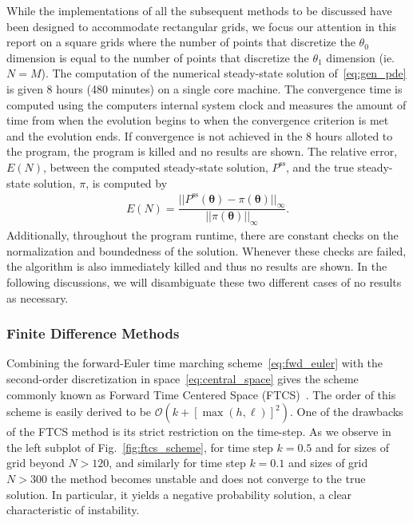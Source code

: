 \documentclass[11pt]{article}
\begin{document}
While the implementations of all the subsequent methods to be discussed have been designed to accommodate rectangular grids, we focus our attention in this report on a square grids where the number of points that discretize the $\theta_{0}$ dimension is equal to the number of points that discretize the $\theta_{1}$ dimension (ie. $N=M$). The computation of the numerical steady-state solution of~\eqref{eq:gen_pde} is given 8 hours (480 minutes) on a single core machine. The convergence time is computed using the computers internal system clock and measures the amount of time from when the evolution begins to when the convergence criterion is met and the evolution ends. If convergence is not achieved in the 8 hours alloted to the program, the program is killed and no results are shown. The relative error, $E(N)$, between the computed steady-state solution, $P^{\mathrm{ss}}$, and the true steady-state solution, $\pi$, is computed by
\begin{align}
    E(N) = \dfrac{||P^{\mathrm{ss}}(\bm{\theta})-\pi(\bm{\theta})||_{\infty}}{||\pi(\bm{\theta})||_{\infty}}.
\end{align}
Additionally, throughout the program runtime, there are constant checks on the normalization and boundedness of the solution. Whenever these checks are failed, the algorithm is also immediately killed and thus no results are shown. In the following discussions, we will disambiguate these two different cases of no results as necessary.

\subsubsection{Finite Difference Methods}

Combining the forward-Euler time marching scheme~\eqref{eq:fwd_euler} with the second-order discretization in space~\eqref{eq:central_space} gives the scheme commonly known as Forward Time Centered Space (FTCS)~\cite{fletcher2013computational}. The order of this scheme is easily derived to be $\mathcal{O}(k + [\max(h,\ell)]^{2})$. One of the drawbacks of the FTCS method is its strict restriction on the time-step. As we observe in the left subplot of Fig.~\ref{fig:ftcs_scheme}, for time step $k=0.5$ and for sizes of grid beyond $N > 120$, and similarly for time step $k=0.1$ and sizes of grid $N > 300$ the method becomes unstable and does not converge to the true solution. In particular, it yields a negative probability solution, a clear characteristic of instability. 
\end{document}

